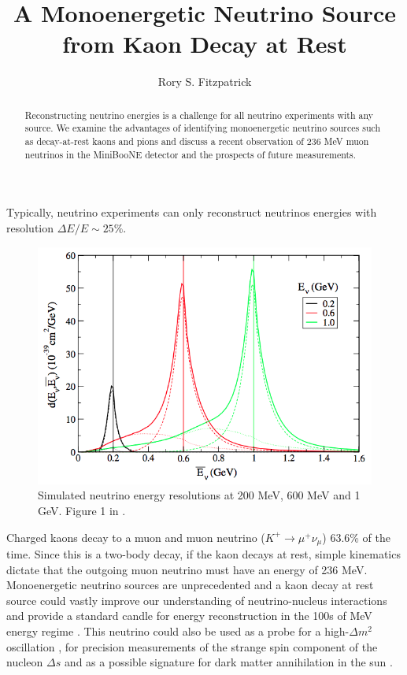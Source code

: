 \documentclass[
aps,
prl,
reprint,
showpacs,
]{revtex4-1}
\begin{document}
\title{A Monoenergetic Neutrino Source from Kaon Decay at Rest}

\author{Rory S. Fitzpatrick}

\begin{abstract}
\noindent Reconstructing neutrino energies is a challenge for all neutrino experiments with any source. We examine the advantages of identifying monoenergetic neutrino sources such as decay-at-rest kaons and pions and discuss a recent observation of 236 MeV muon neutrinos in the MiniBooNE detector and the prospects of future measurements. 
\end{abstract}


\maketitle

Typically, neutrino experiments can only reconstruct neutrinos energies with resolution $\Delta E/E \sim 25\%$. 

\begin{figure}[h]
\includegraphics[width=.95\linewidth]{img/nuRes} 
\caption{Simulated neutrino energy resolutions at 200 MeV, 600 MeV and 1 GeV. Figure 1 in \cite{martini}.}
\label{fig:ereco}
\end{figure}

Charged kaons decay to a muon and muon neutrino ($K^+ \rightarrow \mu^+ \nu_\mu$) 63.6\% of the time. Since this is a two-body decay, if the kaon decays at rest, simple kinematics dictate that the outgoing muon neutrino must have an energy of 236 MeV. Monoenergetic neutrino sources are unprecedented and a kaon decay at rest source could vastly improve our understanding of neutrino-nucleus interactions and provide a standard candle for energy reconstruction in the 100s of MeV energy regime \cite{kdar2}. This neutrino could also be used as a probe for a high-$\Delta m^2$ oscillation \cite{kdar1, kdar3}, for precision measurements of the strange spin component of the nucleon $\Delta s$ \cite{kdar2} and as a possible signature for dark matter annihilation in the sun \cite{kumar, kumar2}.
\end{document}
